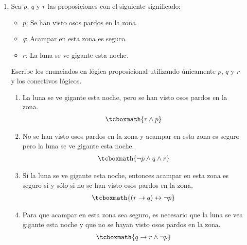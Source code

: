 \documentclass[10pt,letterpaper]{article}
\begin{document}
\begin{enumerate}
    \item Sea $p$, $q$ y $r$ las proposiciones con el siguiente significado:\\
        \begin{itemize}
            \item $p$: Se han visto osos pardos en la zona.
            \item $q$: Acampar en esta zona es seguro.
            \item $r$: La luna se ve gigante esta noche.
        \end{itemize}
        Escribe los enunciados en lógica proposicional utilizando únicamente
        $p$, $q$ y $r$ y los conectivos lógicos.

        \begin{enumerate}
            \item La luna se ve gigante esta noche, pero se han visto osos
            pardos en la zona.
                \begin{equation*} \begin{split}
                    \tcboxmath{r \land p}
                \end{split} \end{equation*}

            \item No se han visto osos pardos en la zona y acampar en esta
            zona es seguro pero la luna se ve gigante esta noche.
                \begin{equation*} \begin{split}
                    \tcboxmath{\neg p \land q \land r}
                \end{split} \end{equation*}

            \item Si la luna se ve gigante esta noche, entonces acampar en esta zona
            es seguro si y sólo si no se han visto osos pardos en la zona.
                \begin{equation*} \begin{split}
                    \tcboxmath{(r \rightarrow q) \leftrightarrow \neg p}
                \end{split} \end{equation*}

            \item Para que acampar en esta zona sea seguro, es necesario que la luna
            se vea gigante esta noche y que no se hayan visto osos pardos en la zona.
                \begin{equation*} \begin{split}
                    \tcboxmath{q \rightarrow r \land \neg p}
                \end{split} \end{equation*}
        \end{enumerate}


\end{enumerate}
\end{document}
